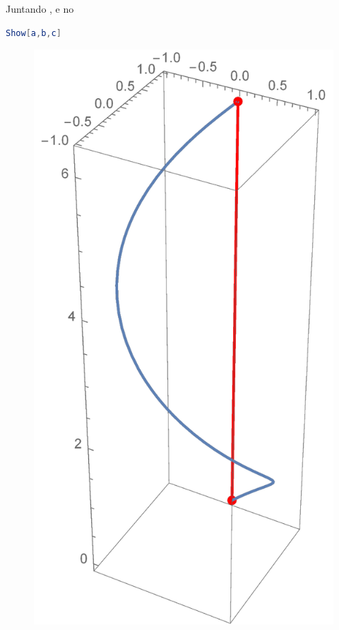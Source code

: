 \documentclass[a4paper, 12pt]{article}
\begin{document}
Juntando ,  e  no 

\begin{lstlisting}[language=Mathematica]
Show[a,b,c]
\end{lstlisting}

\begin{figure}[!h]
	\centering
	\includegraphics[scale=.5]{images/ShowNew}
\end{figure}
\end{document}
